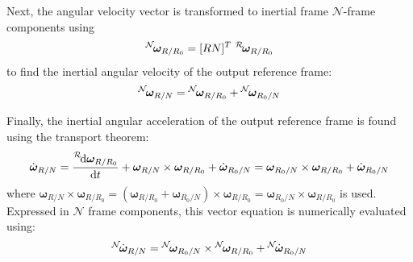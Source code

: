 Next, the angular velocity vector is transformed to inertial frame $\mathcal{N}$-frame components using
\begin{equation}
	\label{eq:mRot4}
	\leftexp{N}{\bm\omega}_{R/R_{0}} = [RN]^{T}\ \leftexp{R}{\bm\omega}_{R/R_{0}}
\end{equation}
to find the inertial angular velocity of the output reference frame:
\begin{equation}
	\label{eq:mRot5}
	\leftexp{N}{\bm\omega}_{R/N} = \leftexp{N}{\bm\omega}_{R/R_{0}} + \leftexp{N}{\bm\omega}_{R_{0}/N}
\end{equation}

Finally, the inertial angular acceleration of the output reference frame is found using the transport theorem:
\begin{equation}
	\label{eq:mRot6}
	\dot{\bm\omega}_{R/N} = 
	\frac{\leftexp{R}{\D} {\bm\omega}_{R/R_{0}}}{\D t} 
	 + \bm\omega_{R/N} \times {\bm\omega}_{R/R_{0}}
	+ \dot{\bm\omega}_{R_{0}/N}
	= \bm\omega_{R_{0}/N} \times {\bm\omega}_{R/R_{0}}
	+ \dot{\bm\omega}_{R_{0}/N}
\end{equation}
where $\bm\omega_{R/N} \times {\bm\omega}_{R/R_{0}} = (\bm\omega_{R/R_{0}} +\bm\omega_{R_{0}/N}) \times {\bm\omega}_{R/R_{0}} = \bm\omega_{R_{0}/N} \times {\bm\omega}_{R/R_{0}}$ is used.  Expressed in $\mathcal{N}$ frame components, this vector equation is numerically evaluated using:
\begin{equation}
	\label{eq:mRot7}
	\leftexp{N}{\dot{\bm\omega}}_{R/N} = \leftexp{N}{\bm\omega}_{R_{0}/N} \times \leftexp{N}{\bm\omega}_{R/R_{0}}
	+ \leftexp{N}{\dot{\bm\omega}}_{R_{0}/N}
\end{equation}




